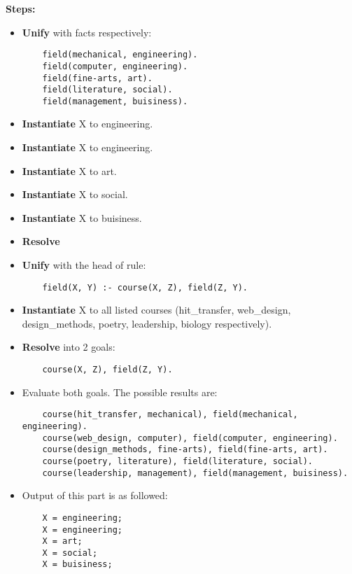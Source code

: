 \textbf{Steps:}
\begin{itemize}
    \item \textbf{Unify} with facts respectively:
    \begin{lstlisting}
    field(mechanical, engineering).
    field(computer, engineering).
    field(fine-arts, art).
    field(literature, social).
    field(management, buisiness).
    \end{lstlisting}
    \item \textbf{Instantiate} X to engineering.
    \item \textbf{Instantiate} X to engineering.
    \item \textbf{Instantiate} X to art.
    \item \textbf{Instantiate} X to social.
    \item \textbf{Instantiate} X to buisiness.
    \item \textbf{Resolve}
\end{itemize}

\begin{itemize}
    \item \textbf{Unify} with the head of rule:
    \begin{lstlisting}
    field(X, Y) :- course(X, Z), field(Z, Y).
    \end{lstlisting}
\item \textbf{Instantiate} X to all listed courses (hit\_transfer, web\_design, design\_methods, poetry, leadership, biology respectively).
\item \textbf{Resolve} into 2 goals:
    \begin{lstlisting}
    course(X, Z), field(Z, Y).
    \end{lstlisting}
\item Evaluate both goals. The possible results are:
    \begin{lstlisting}
    course(hit_transfer, mechanical), field(mechanical, engineering). 
    course(web_design, computer), field(computer, engineering).
    course(design_methods, fine-arts), field(fine-arts, art).
    course(poetry, literature), field(literature, social).
    course(leadership, management), field(management, buisiness).
    \end{lstlisting}
\item Output of this part is as followed:
    \begin{lstlisting}
    X = engineering;
    X = engineering;
    X = art;
    X = social;
    X = buisiness;
    \end{lstlisting}
\end{itemize}

